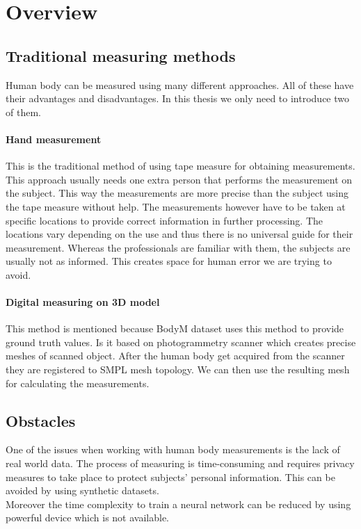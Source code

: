 \chapter{Overview}


\section{Traditional measuring methods}
Human body can be measured using many different approaches. All of these have their advantages and disadvantages. In this thesis we only need to introduce two of them.

\subsubsection{Hand measurement}
This is the traditional method of using tape measure for obtaining measurements. This approach usually needs one extra person that performs the measurement on the subject. This way the measurements are more precise than the subject using the tape measure without help. The measurements however have to be taken at specific locations to provide correct information in further processing. The locations vary depending on the use and thus there is no universal guide for their measurement. Whereas the professionals are familiar with them, the subjects are usually not as informed. This creates space for human error we are trying to avoid.

\subsubsection{Digital measuring on 3D model}
This method is mentioned because BodyM dataset uses this method to provide ground truth values. Is it based on photogrammetry scanner which creates precise meshes of scanned object. After the human body get acquired from the scanner they are registered to SMPL \cite{smpl} mesh topology. We can then use the resulting mesh for calculating the measurements.


\section{Obstacles}
One of the issues when working with human body measurements is the lack of real world data. The process of measuring is time-consuming and requires privacy measures to take place to protect subjects' personal information. This can be avoided by using synthetic datasets.\\
Moreover the time complexity to train a neural network can be reduced by using powerful device which is not available.


